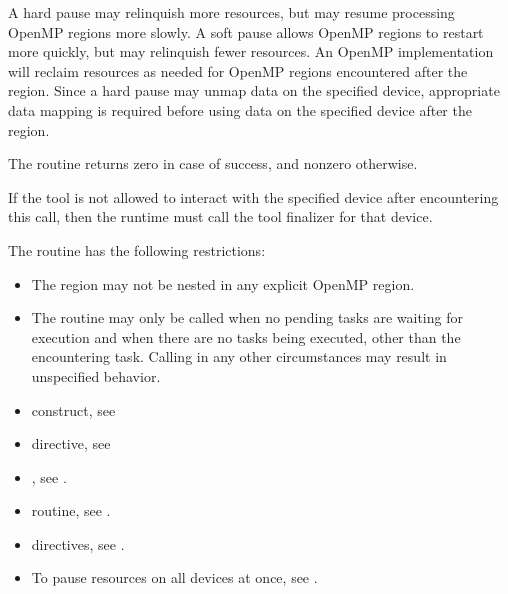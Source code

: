 \begin{note}
A hard pause may relinquish more resources, but may resume processing 
OpenMP regions more slowly. A soft pause allows OpenMP regions to 
restart more quickly, but may relinquish fewer resources. An OpenMP 
implementation will reclaim resources as needed for OpenMP regions 
encountered after the  region. Since  a hard 
pause may unmap data on the specified device, appropriate data mapping 
is required before using data on the specified device after the 
 region.
 \end{note}
 
The routine returns zero in case of success, and nonzero otherwise.

\tools

If the tool is not allowed to interact with the specified device 
after encountering this call, then the runtime must call the tool 
finalizer for that device.

\restrictions
The  routine has the following restrictions:

\begin{itemize}
\item The  region may not be nested in any explicit
      OpenMP region.
\item The routine may only be called when no pending tasks are waiting
      for execution and when there are no tasks being executed, other than
      the encountering task.  Calling in any other circumstances may result
      in unspecified behavior.
\end{itemize}

\crossreferences
\begin{itemize}

\item {} construct, see

\item {} directive, see

\item {}, see
.

\item {} routine, see
.

\item {} directives, see
.

\item To pause resources on all devices at once, see
.
\end{itemize}



